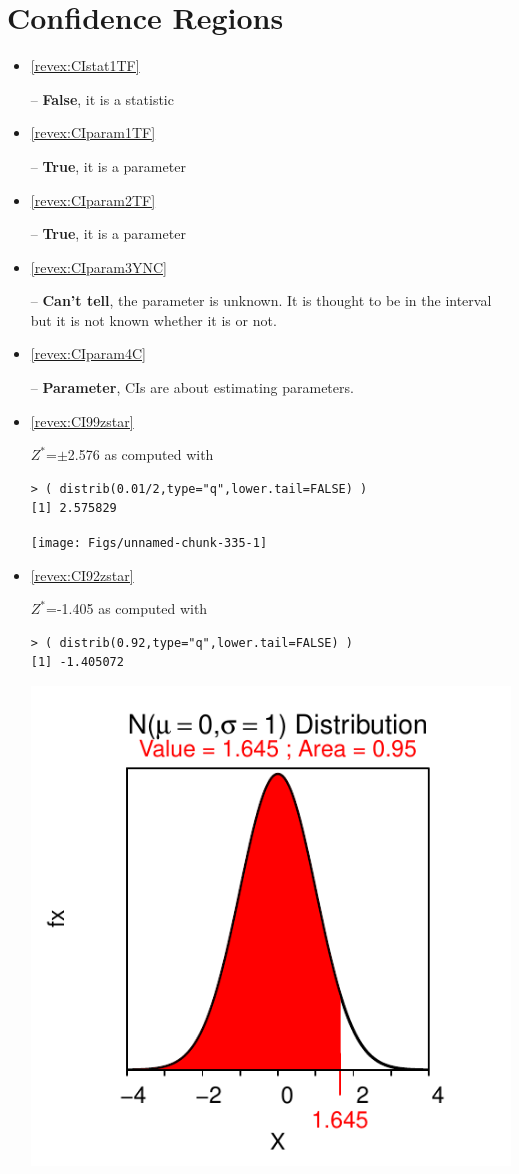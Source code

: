 \documentclass[10pt,openany]{book}\usepackage[]{graphicx}\usepackage[]{color}
\makeatletter
\newenvironment{kframe}{%
 \def\at@end@of@kframe{}%
 \ifinner\ifhmode%
  \def\at@end@of@kframe{\end{minipage}}%
  \begin{minipage}{\columnwidth}%
 \fi\fi%
 \def\FrameCommand##1{\hskip\@totalleftmargin \hskip-\fboxsep
 \colorbox{shadecolor}{##1}\hskip-\fboxsep
     \hskip-\linewidth \hskip-\@totalleftmargin \hskip\columnwidth}%
 \MakeFramed {\advance\hsize-\width
   \@totalleftmargin\z@ \linewidth\hsize
   \@setminipage}}%
 {\par\unskip\endMakeFramed%
 \at@end@of@kframe}
\newenvironment{knitrout}{}{} %
\makeatother
\begin{document}
\section*{Confidence Regions}
\begin{itemize}
  \item \hypertarget{ans:CIstat1TF}{\ref{revex:CIstat1TF}} -- \textbf{False}, it is a statistic
  \item \hypertarget{ans:CIparam1TF}{\ref{revex:CIparam1TF}} -- \textbf{True}, it is a parameter
  \item \hypertarget{ans:CIparam2TF}{\ref{revex:CIparam2TF}} -- \textbf{True}, it is a parameter
  \item \hypertarget{ans:CIparam3YNC}{\ref{revex:CIparam3YNC}} -- \textbf{Can't tell}, the parameter is unknown.  It is thought to be in the interval but it is not known whether it is or not.
  \item \hypertarget{ans:CIparam4C}{\ref{revex:CIparam4C}} -- \textbf{Parameter}, CIs are about estimating parameters.

  \item \hypertarget{ans:CI99zstar}{\ref{revex:CI99zstar}} $Z^{*}$=$\pm$2.576 as computed with
\begin{knitrout}
\color{fgcolor}\begin{kframe}
\begin{verbatim}
> ( distrib(0.01/2,type="q",lower.tail=FALSE) )
[1] 2.575829
\end{verbatim}
\end{kframe}

{\centering \texttt{[image: Figs/unnamed-chunk-335-1]} 

}



\end{knitrout}
  \item \hypertarget{ans:CI92zstar}{\ref{revex:CI92zstar}} $Z^{*}$=-1.405 as computed with
\begin{knitrout}
\color{fgcolor}\begin{kframe}
\begin{verbatim}
> ( distrib(0.92,type="q",lower.tail=FALSE) )
[1] -1.405072
\end{verbatim}
\end{kframe}

{\centering \includegraphics[width=.4\linewidth]{Figs/unnamed-chunk-336-1} 

}
\end{knitrout}
\end{itemize}
\end{document}
